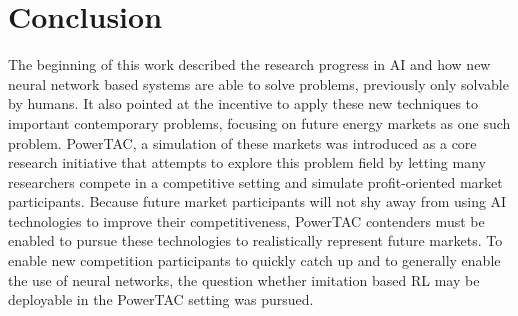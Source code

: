 %
%
%
%
%
%
%
%

\section{Conclusion}%
\label{sec:conclusion}

The beginning of this work described the research progress in \ac{AI} and how new neural network based
systems are able to solve problems, previously only solvable by humans. It also pointed at the incentive to
apply these new techniques to important contemporary problems, focusing on future energy markets as one such problem.
\ac{PowerTAC}, a simulation of these markets was introduced as a core research initiative that attempts to explore this
problem field by letting many researchers compete in a competitive setting and simulate profit-oriented market
participants. Because future market participants will not shy away from using \ac{AI} technologies to improve their
competitiveness, \ac{PowerTAC} contenders must be enabled to pursue these technologies to realistically represent
future markets. To enable new competition participants to quickly catch up and to generally enable the use of neural
networks, the question whether imitation based \ac{RL} may be deployable in the \ac{PowerTAC}
setting was pursued.

